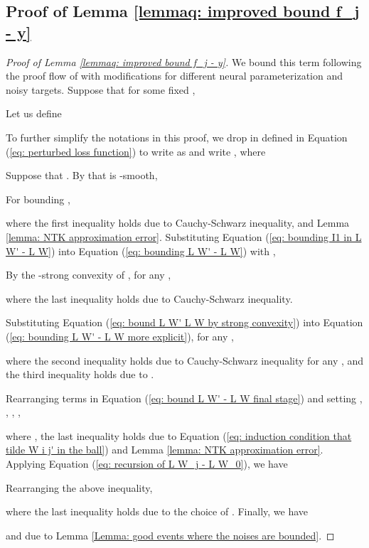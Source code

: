 \documentclass{article} \usepackage{iclr2023/iclr2023_conference,times}
\begin{document}
\subsection{Proof of Lemma \ref{lemmaq: improved bound f_j - y}} 
\label{subsection: proof of lemma f_j - y}
\begin{proof}[Proof of Lemma \ref{lemmaq: improved bound f_j - y}]
We bound this term following the proof flow of \cite[Lemma~C.3]{zhou2020neural} with modifications for different neural parameterization and noisy targets. Suppose that for some fixed , 

Let us define 

To further simplify the notations in this proof, we drop  in  defined in Equation (\ref{eq: perturbed loss function}) to write  as  and write , where

Suppose that . By that  is -smooth, 

For bounding , 

where the first inequality holds due to Cauchy-Schwarz inequality,  and Lemma \ref{lemma: NTK approximation error}. Substituting Equation (\ref{eq: bounding I1 in  L W' - L W}) into Equation (\ref{eq: bounding L W' - L W}) with ,


By the -strong convexity of , for any ,

where the last inequality holds due to Cauchy-Schwarz inequality. 

Substituting Equation (\ref{eq: bound L W' L W by strong convexity}) into Equation (\ref{eq: bounding L W' - L W more explicit}), for any ,

where the second inequality holds due to Cauchy-Schwarz inequality for any , and the third inequality holds due to  . 

Rearranging terms in Equation (\ref{eq: bound L W' - L W final stage}) and setting , , , , 


where , the last inequality holds due to Equation (\ref{eq: induction condition that tilde W i j' in the ball}) and Lemma \ref{lemma: NTK approximation error}. Applying Equation (\ref{eq: recursion of L W_j - L W_0}), we have

Rearranging the above inequality, 

where the last inequality holds due to the choice of . 
Finally, we have

and  due to Lemma \ref{Lemma: good events where the noises are bounded}.
\end{proof}
\end{document}
